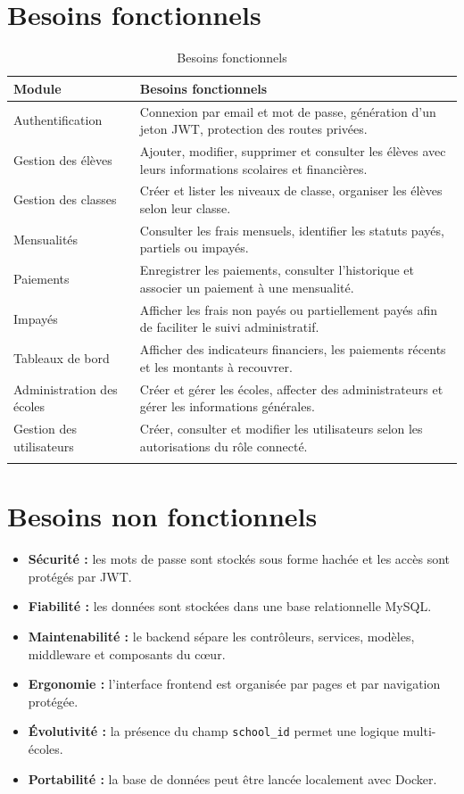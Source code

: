 \documentclass[12pt,a4paper]{report}
\begin{document}
\section{Besoins fonctionnels}

\begin{longtable}{|p{4cm}|p{10cm}|}
\hline
\textbf{Module} & \textbf{Besoins fonctionnels} \\
\hline
Authentification & Connexion par email et mot de passe, génération d'un jeton JWT, protection des routes privées. \\
\hline
Gestion des élèves & Ajouter, modifier, supprimer et consulter les élèves avec leurs informations scolaires et financières. \\
\hline
Gestion des classes & Créer et lister les niveaux de classe, organiser les élèves selon leur classe. \\
\hline
Mensualités & Consulter les frais mensuels, identifier les statuts payés, partiels ou impayés. \\
\hline
Paiements & Enregistrer les paiements, consulter l'historique et associer un paiement à une mensualité. \\
\hline
Impayés & Afficher les frais non payés ou partiellement payés afin de faciliter le suivi administratif. \\
\hline
Tableaux de bord & Afficher des indicateurs financiers, les paiements récents et les montants à recouvrer. \\
\hline
Administration des écoles & Créer et gérer les écoles, affecter des administrateurs et gérer les informations générales. \\
\hline
Gestion des utilisateurs & Créer, consulter et modifier les utilisateurs selon les autorisations du rôle connecté. \\
\hline
\caption{Besoins fonctionnels}
\end{longtable}

\section{Besoins non fonctionnels}

\begin{itemize}[label=--]
    \item \textbf{Sécurité :} les mots de passe sont stockés sous forme hachée et les accès sont protégés par JWT.
    \item \textbf{Fiabilité :} les données sont stockées dans une base relationnelle MySQL.
    \item \textbf{Maintenabilité :} le backend sépare les contrôleurs, services, modèles, middleware et composants du cœur.
    \item \textbf{Ergonomie :} l'interface frontend est organisée par pages et par navigation protégée.
    \item \textbf{Évolutivité :} la présence du champ \texttt{school\_id} permet une logique multi-écoles.
    \item \textbf{Portabilité :} la base de données peut être lancée localement avec Docker.
\end{itemize}
\end{document}
